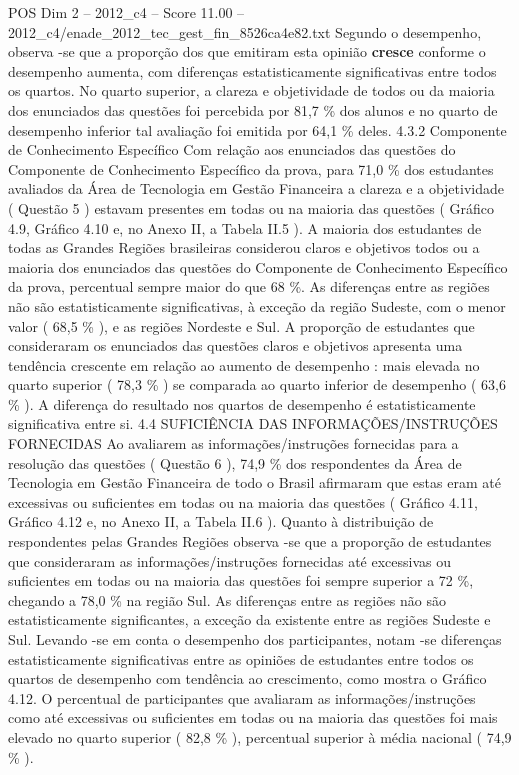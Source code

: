\begin{textsample}{POS Dim 2 – 2012\_c4 – Score 11.00 – 2012\_c4/enade\_2012\_tec\_gest\_fin\_8526ca4e82.txt}
Segundo o desempenho, observa -se que a proporção dos que emitiram esta opinião \textbf{cresce} conforme o desempenho aumenta, com diferenças estatisticamente significativas entre todos os quartos.
No quarto superior, a clareza e objetividade de todos ou da maioria dos enunciados das questões foi percebida por 81,7 \% dos alunos e no quarto de desempenho inferior tal avaliação foi emitida por 64,1 \% deles. 4.3.2 Componente de Conhecimento Específico Com relação aos enunciados das questões do Componente de Conhecimento Específico da prova, para 71,0 \% dos estudantes avaliados da Área de Tecnologia em Gestão Financeira a clareza e a objetividade ( Questão 5 ) estavam presentes em todas ou na maioria das questões ( Gráfico 4.9, Gráfico 4.10 e, no Anexo II, a Tabela II.5 ).
A maioria dos estudantes de todas as Grandes Regiões brasileiras considerou claros e objetivos todos ou a maioria dos enunciados das questões do Componente de Conhecimento Específico da prova, percentual sempre maior do que 68 \%.
As diferenças entre as regiões não são estatisticamente significativas, à exceção da região Sudeste, com o menor valor ( 68,5 \% ), e as regiões Nordeste e Sul.
A proporção de estudantes que consideraram os enunciados das questões claros e objetivos apresenta uma tendência crescente em relação ao aumento de desempenho : mais elevada no quarto superior ( 78,3 \% ) se comparada ao quarto inferior de desempenho ( 63,6 \% ).
A diferença do resultado nos quartos de desempenho é estatisticamente significativa entre si. 4.4 SUFICIÊNCIA DAS INFORMAÇÕES/INSTRUÇÕES FORNECIDAS Ao avaliarem as informações/instruções fornecidas para a resolução das questões ( Questão 6 ), 74,9 \% dos respondentes da Área de Tecnologia em Gestão Financeira de todo o Brasil afirmaram que estas eram até excessivas ou suficientes em todas ou na maioria das questões ( Gráfico 4.11, Gráfico 4.12 e, no Anexo II, a Tabela II.6 ).
Quanto à distribuição de respondentes pelas Grandes Regiões observa -se que a proporção de estudantes que consideraram as informações/instruções fornecidas até excessivas ou suficientes em todas ou na maioria das questões foi sempre superior a 72 \%, chegando a 78,0 \% na região Sul.
As diferenças entre as regiões não são estatisticamente significantes, a exceção da existente entre as regiões Sudeste e Sul.
Levando -se em conta o desempenho dos participantes, notam -se diferenças estatisticamente significativas entre as opiniões de estudantes entre todos os quartos de desempenho com tendência ao crescimento, como mostra o Gráfico 4.12.
O percentual de participantes que avaliaram as informações/instruções como até excessivas ou suficientes em todas ou na maioria das questões foi mais elevado no quarto superior ( 82,8 \% ), percentual superior à média nacional ( 74,9 \% ).

\end{textsample}
